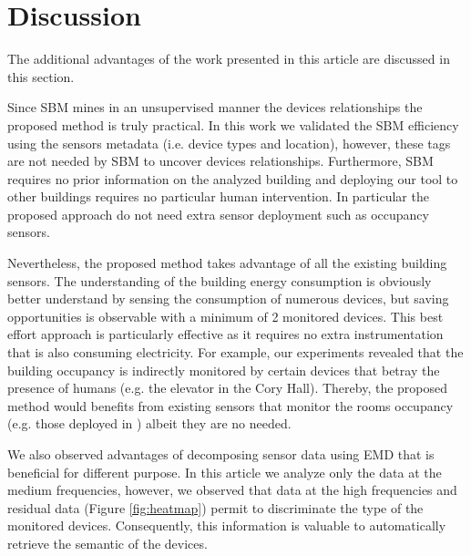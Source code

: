 \section{Discussion}
The additional advantages of the work presented in this article are discussed in this section.

Since SBM mines in an unsupervised manner the devices relationships the proposed method is truly practical. 
In this work we validated the SBM efficiency using the sensors metadata (i.e. device types and location), however, these tags are not needed by SBM to uncover devices relationships.
Furthermore, SBM requires no prior information on the analyzed building and deploying our tool to other buildings requires no particular human intervention.
In particular the proposed approach do not need extra sensor deployment such as occupancy sensors. 

Nevertheless, the proposed method takes advantage of all the existing building sensors.
The understanding of the building energy consumption is obviously better understand by sensing the consumption of numerous devices, 
but saving opportunities is observable with a minimum of 2 monitored devices.
This best effort approach is particularly effective as it requires no extra instrumentation that is also consuming electricity.
For example, our experiments revealed that the building occupancy is indirectly monitored by certain devices that betray the presence of humans (e.g. the elevator in the Cory Hall). 
Thereby, the proposed method would benefits from existing sensors that monitor the rooms occupancy (e.g. those deployed in \cite{agarwal:ipsn2011,erickson:ipsn2011}) albeit they are no needed.


We also observed advantages of decomposing sensor data using EMD that is beneficial for different purpose.
In this article we analyze only the data at the medium frequencies, however, we observed that data at the high frequencies and residual data (Figure \ref{fig:heatmap}) permit to discriminate the type of the monitored devices.
Consequently, this information is valuable to automatically retrieve the semantic of the devices.


% 
% 


